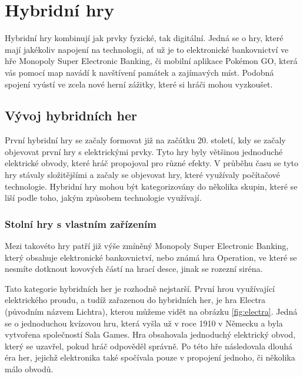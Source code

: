 \chapter{Hybridní hry}
Hybridní hry kombinují jak prvky fyzické, tak digitální. Jedná se o hry, které mají jakékoliv napojení na technologii, ať už je to elektronické bankovnictví ve hře Monopoly Super Electronic Banking, či mobilní aplikace Pokémon GO, která vás pomocí map navádí k navštívení památek a zajímavých míst. Podobná spojení vyústí ve zcela nové herní zážitky, které si hráči mohou vyzkoušet.\cite{hybrid_board_games_design}

\section{Vývoj hybridních her}
První hybridní hry se začaly formovat již na začátku 20. století, kdy se začaly objevovat první hry s elektrickými prvky. Tyto hry byly většinou jednoduché elektrické obvody, které hráč propojoval pro různé efekty. V průběhu času se tyto hry stávaly složitějšími a začaly se objevovat hry, které využívaly počítačové technologie. Hybridní hry mohou být kategorizovány do několika skupin, které se liší podle toho, jakým způsobem technologie využívají.\cite{history_of_hybrid_games}

\subsection{Stolní hry s vlastním zařízením}
Mezi takovéto hry patří již výše zmíněný Monopoly Super Electronic Banking, který obsahuje elektronické bankovnictví, nebo známá hra Operation, ve které se nesmíte dotknout kovových částí na hrací desce, jinak se rozezní siréna. 

Tato kategorie hybridních her je rozhodně nejstarší. První hrou využívající elektrického proudu, a tudíž zařazenou do hybridních her, je hra Electra (původním názvem Lichtra), kterou můžeme vidět na obrázku \ref{fig:electra}. Jedná se o jednoduchou kvízovou hru, která vyšla už v roce 1910 v Německu a byla vytvořena společností Sala Games. Hra obsahovala jednoduchý elektrický obvod, který se uzavřel, pokud hráč odpověděl správně. Po této hře následovala dlouhá éra her, jejichž elektronika také spočívala pouze v propojení jednoho, či několika málo obvodů.\cite{history_of_hybrid_games, boardgames_with_apps}

